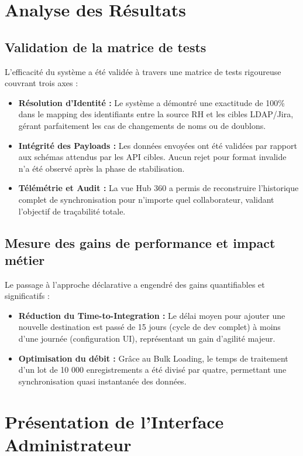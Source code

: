 \section{Analyse des Résultats}
\label{sec:analyse_resultats}

\subsection{Validation de la matrice de tests}
L'efficacité du système a été validée à travers une matrice de tests rigoureuse couvrant trois axes :
\begin{itemize}
    \item \textbf{Résolution d'Identité :} Le système a démontré une exactitude de 100\% dans le mapping des identifiants entre la source RH et les cibles LDAP/Jira, gérant parfaitement les cas de changements de noms ou de doublons.
    \item \textbf{Intégrité des Payloads :} Les données envoyées ont été validées par rapport aux schémas attendus par les API cibles. Aucun rejet pour format invalide n'a été observé après la phase de stabilisation.
    \item \textbf{Télémétrie et Audit :} La vue Hub 360 a permis de reconstruire l'historique complet de synchronisation pour n'importe quel collaborateur, validant l'objectif de traçabilité totale.
\end{itemize}

\subsection{Mesure des gains de performance et impact métier}
Le passage à l'approche déclarative a engendré des gains quantifiables et significatifs :
\begin{itemize}
    \item \textbf{Réduction du Time-to-Integration :} Le délai moyen pour ajouter une nouvelle destination est passé de 15 jours (cycle de dev complet) à moins d'une journée (configuration UI), représentant un gain d'agilité majeur.
    \item \textbf{Optimisation du débit :} Grâce au Bulk Loading, le temps de traitement d'un lot de 10 000 enregistrements a été divisé par quatre, permettant une synchronisation quasi instantanée des données.
\end{itemize}

\section{Présentation de l'Interface Administrateur}
\label{sec:interface}

